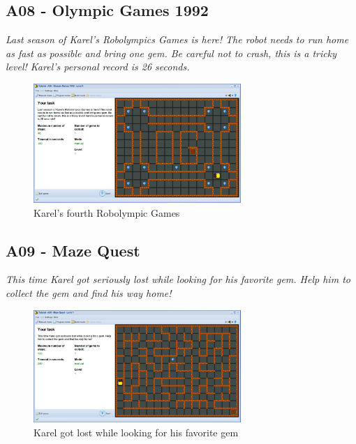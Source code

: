 \documentclass[article,A4,12pt]{llncs}
\begin{document}
\subsection{A08 - Olympic Games 1992}

{\em Last season of Karel's Robolympics Games is here! The 
robot needs to run home as fast as possible and bring one gem. 
Be careful not to crash, this is a tricky level! Karel's personal record is 26 seconds.}\\[-7mm]

\begin{figure}[!ht]
\begin{center}
\includegraphics[width=0.7\textwidth]{img/a08.png}
\end{center}
\vspace{-4mm}
\caption{Karel's fourth Robolympic Games}
\label{fig:a08}
\vspace{-4mm}
\end{figure}
\noindent


\subsection{A09 - Maze Quest}

{\em This time Karel got seriously lost while looking for his favorite gem. 
Help him to collect the gem and find his way home!}\\[-7mm]

\begin{figure}[!ht]
\begin{center}
\includegraphics[width=0.7\textwidth]{img/a09.png}
\end{center}
\vspace{-4mm}
\caption{Karel got lost while looking for his favorite gem}
\label{fig:a09}
\vspace{-4mm}
\end{figure}
\noindent
\newpage
\end{document}
